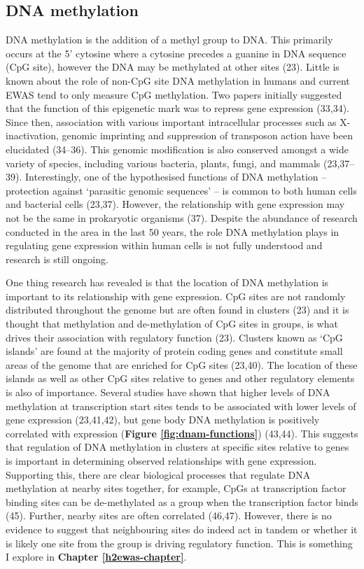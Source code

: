 \documentclass[11pt,twoside]{bristolthesis}
\begin{document}
\hypertarget{dna-methylation}{%
\subsection{DNA methylation}\label{dna-methylation}}

DNA methylation is the addition of a methyl group to DNA. This primarily occurs at the 5' cytosine where a cytosine precedes a guanine in DNA sequence (CpG site), however the DNA may be methylated at other sites (23). Little is known about the role of non-CpG site DNA methylation in humans and current EWAS tend to only measure CpG methylation. Two papers initially suggested that the function of this epigenetic mark was to repress gene expression (33,34). Since then, association with various important intracellular processes such as X-inactivation, genomic imprinting and suppression of transposon action have been elucidated (34--36). This genomic modification is also conserved amongst a wide variety of species, including various bacteria, plants, fungi, and mammals (23,37--39). Interestingly, one of the hypothesised functions of DNA methylation -- protection against `parasitic genomic sequences' -- is common to both human cells and bacterial cells (23,37). However, the relationship with gene expression may not be the same in prokaryotic organisms (37). Despite the abundance of research conducted in the area in the last 50 years, the role DNA methylation plays in regulating gene expression within human cells is not fully understood and research is still ongoing.

One thing research has revealed is that the location of DNA methylation is important to its relationship with gene expression. CpG sites are not randomly distributed throughout the genome but are often found in clusters (23) and it is thought that methylation and de-methylation of CpG sites in groups, is what drives their association with regulatory function (23). Clusters known as `CpG islands' are found at the majority of protein coding genes and constitute small areas of the genome that are enriched for CpG sites (23,40). The location of these islands as well as other CpG sites relative to genes and other regulatory elements is also of importance. Several studies have shown that higher levels of DNA methylation at transcription start sites tends to be associated with lower levels of gene expression (23,41,42), but gene body DNA methylation is positively correlated with expression (\textbf{Figure \ref{fig:dnam-functions}}) (43,44). This suggests that regulation of DNA methylation in clusters at specific sites relative to genes is important in determining observed relationships with gene expression. Supporting this, there are clear biological processes that regulate DNA methylation at nearby sites together, for example, CpGs at transcription factor binding sites can be de-methylated as a group when the transcription factor binds (45). Further, nearby sites are often correlated (46,47). However, there is no evidence to suggest that neighbouring sites do indeed act in tandem or whether it is likely one site from the group is driving regulatory function. This is something I explore in \textbf{Chapter \ref{h2ewas-chapter}}.
\end{document}
